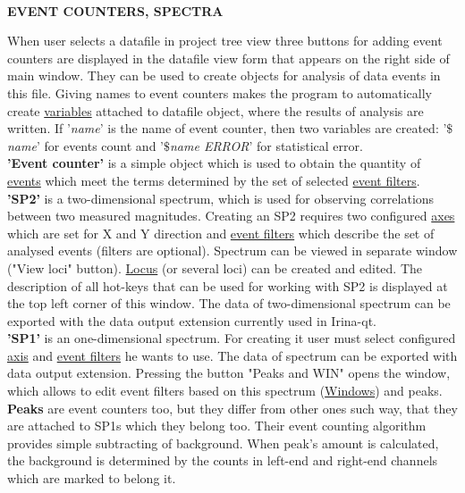 \documentclass[a4paper]{article}
\begin{document}
%
\hypertarget{counters}{\\}
\begin{center}\textbf{EVENT COUNTERS, SPECTRA}\end{center}
{
When user selects a datafile in project tree view three buttons for adding event counters are displayed in the datafile view form that appears on the right side of main window. 
They can be used to create objects for analysis of data events in this file. 
Giving names to event counters makes the program to automatically create \hyperlink{variable}{variables} attached to datafile object, where the results of analysis are written. 
If '\textit{name}' is the name of event counter, then two variables are created: '\textit{$\$$name}' for events count and '\textit{$\$$name ERROR}' for statistical error.
\hypertarget{eventcnt}{\\}
\textbf{'Event counter'} is a simple object which is used to obtain the quantity of \hyperlink{datafile}{events} which meet the terms determined by the set of selected \hyperlink{filters}{event filters}.
\hypertarget{sp2}{\\}
\textbf{'SP2'} is a two-dimensional spectrum, which is used for observing correlations between two measured magnitudes. 
Creating an SP2 requires two configured \hyperlink{axis}{axes} which are set for X and Y direction and \hyperlink{filters}{event filters} which describe the set of analysed events (filters are optional). 
Spectrum can be viewed in separate window ("View loci" button). \hyperlink{loc}{Locus} (or several loci) can be created and edited. 
The description of all hot-keys that can be used for working with SP2 is displayed at the top left corner of this window. 
The data of two-dimensional spectrum can be exported with the data output extension currently used in Irina-qt.
\hypertarget{sp1}{\\}
\textbf{'SP1'} is an one-dimensional spectrum. 
For creating it user must select configured \hyperlink{axis}{axis} and \hyperlink{filters}{event filters} he wants to use.
The data of spectrum can be exported with data output extension.
Pressing the button "Peaks and WIN" opens the window, which allows to edit event filters based on this spectrum (\hyperlink{win}{Windows}) and peaks.
\\
\textbf{Peaks} are event counters too, but they differ from other ones such way, that they are attached to SP1s which they belong too. Their event counting algorithm provides simple subtracting of background.
When peak's amount is calculated, the background is determined by the counts in left-end and right-end channels which are marked to belong it.
}
\end{document}
